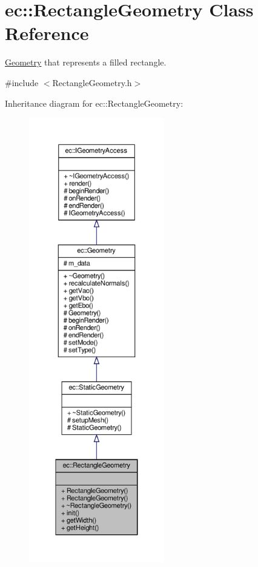 \hypertarget{classec_1_1_rectangle_geometry}{}\section{ec\+:\+:Rectangle\+Geometry Class Reference}
\label{classec_1_1_rectangle_geometry}


\mbox{\hyperlink{classec_1_1_geometry}{Geometry}} that represents a filled rectangle.  




{\ttfamily \#include $<$Rectangle\+Geometry.\+h$>$}



Inheritance diagram for ec\+:\+:Rectangle\+Geometry\+:\nopagebreak
\begin{figure}[H]
\begin{center}
\leavevmode
\includegraphics[height=550pt]{classec_1_1_rectangle_geometry__inherit__graph}
\end{center}
\end{figure}


